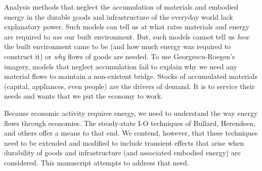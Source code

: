 Analysis methods that neglect the accumulation 
of materials and embodied energy 
in the durable goods and infrastructure 
of the everyday world lack explanatory power. 
Such models can tell us at what rates materials and energy are required 
to \emph{use} our built environment. 
But, such models cannot tell us \emph{how} 
the built environment came to be 
(and how much energy was required to construct it) 
or \emph{why} flows of goods are needed. 
To use Georgescu-Roegen's imagery, 
models that neglect accumulation fail to explain 
why we need any material flows to maintain a non-existent bridge. 
Stocks of accumulated materials 
(capital, appliances, even people) 
are the drivers of demand. 
It is to service their needs and wants that we put the economy to work. 

Because economic activity requires energy, 
we need to understand the way energy flows through economies. 
The steady-state I-O techniques of Bullard, Herendeen, 
and others\cite{Bullard1975,Herendeen1978} 
offer a means to that end. 
We contend, however, that these techniques 
need to be extended and modified to include transient effects 
that arise when durability of goods and infrastructure 
(and associated embodied energy) are considered. 
This manuscript attempts to address that need.




%

